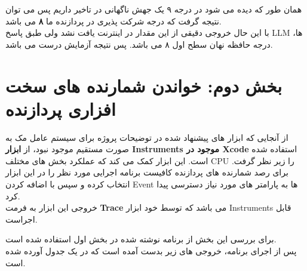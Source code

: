 \documentclass{article}
\begin{document}
\begin{tcolorbox}[colback=green!5!white, colframe=green!75!black, title=نتایج]
	همان طور که دیده می شود در درجه ۹ یک جهش ناگهانی در تاخیر داریم پس می توان نتیجه گرفت که درجه شرکت پذیری در پردازنده ما\textbf{ ۸ }می باشد. \\ با این حال خروجی دقیقی از این مقدار در اینترنت یافت نشد ولی طبق پاسخ LLM ها، درجه حافظه نهان سطح اول ۸ می باشد. پس نتیجه آزمایش درست می باشد.
	
\end{tcolorbox}

\vspace{2cm}
\section{بخش دوم: خواندن شمارنده های سخت افزاری پردازنده}


\begin{tcolorbox}[colback=blue!5!white, colframe=blue!75!black, title=توضیحات]
	از آنجایی که ابزار های پیشنهاد شده در توضیحات پروژه برای سیستم عامل مک به صورت مستقیم موجود نبود، از \textbf{ابزار Instruments موجود در Xcode} استفاده شده است. این ابزار کمک می کند که عملکرد بخش های مختلف CPU را زیر نظر گرفت.
برای رصد شمارنده های پردازنده کافیست برنامه اجرایی مورد نظر را در این ابزار انتخاب کرده و سپس با اضافه کردن Event ها به پارامتر های مورد نیاز دسترسی پیدا کرد. \\ خروجی این ابزار به فرمت \textbf{Trace} می باشد که توسط خود ابزار Instruments قابل اجراست.

\end{tcolorbox}
برای بررسی این بخش از برنامه نوشته شده در بخش اول استفاده شده است.\\
پس از اجرای برنامه، خروجی های زیر بدست آمده است که در یک جدول آورده شده است.
\end{document}
